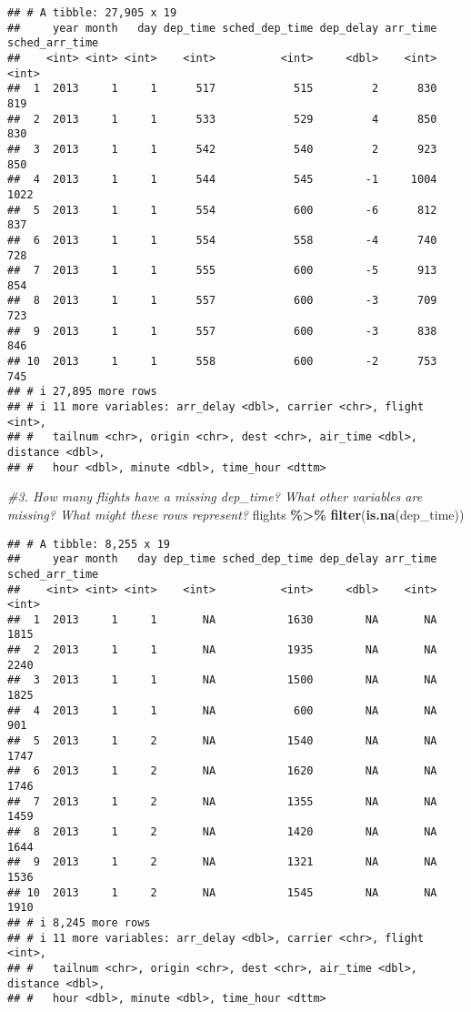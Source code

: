 \documentclass[
]{article}
\newenvironment{Shaded}{\begin{snugshade}}{\end{snugshade}}
\newcommand{\CommentTok}[1]{\textcolor[rgb]{0.56,0.35,0.01}{\textit{#1}}}
\newcommand{\FunctionTok}[1]{\textcolor[rgb]{0.13,0.29,0.53}{\textbf{#1}}}
\newcommand{\NormalTok}[1]{#1}
\newcommand{\SpecialCharTok}[1]{\textcolor[rgb]{0.81,0.36,0.00}{\textbf{#1}}}
\begin{document}
\begin{verbatim}
## # A tibble: 27,905 x 19
##     year month   day dep_time sched_dep_time dep_delay arr_time sched_arr_time
##    <int> <int> <int>    <int>          <int>     <dbl>    <int>          <int>
##  1  2013     1     1      517            515         2      830            819
##  2  2013     1     1      533            529         4      850            830
##  3  2013     1     1      542            540         2      923            850
##  4  2013     1     1      544            545        -1     1004           1022
##  5  2013     1     1      554            600        -6      812            837
##  6  2013     1     1      554            558        -4      740            728
##  7  2013     1     1      555            600        -5      913            854
##  8  2013     1     1      557            600        -3      709            723
##  9  2013     1     1      557            600        -3      838            846
## 10  2013     1     1      558            600        -2      753            745
## # i 27,895 more rows
## # i 11 more variables: arr_delay <dbl>, carrier <chr>, flight <int>,
## #   tailnum <chr>, origin <chr>, dest <chr>, air_time <dbl>, distance <dbl>,
## #   hour <dbl>, minute <dbl>, time_hour <dttm>
\end{verbatim}

\begin{Shaded}
\begin{Highlighting}[]
\CommentTok{\#3. How many flights have a missing dep\_time? What other variables are missing? What might these rows represent?}
\NormalTok{flights }\SpecialCharTok{\%\textgreater{}\%} \FunctionTok{filter}\NormalTok{(}\FunctionTok{is.na}\NormalTok{(dep\_time))}
\end{Highlighting}
\end{Shaded}

\begin{verbatim}
## # A tibble: 8,255 x 19
##     year month   day dep_time sched_dep_time dep_delay arr_time sched_arr_time
##    <int> <int> <int>    <int>          <int>     <dbl>    <int>          <int>
##  1  2013     1     1       NA           1630        NA       NA           1815
##  2  2013     1     1       NA           1935        NA       NA           2240
##  3  2013     1     1       NA           1500        NA       NA           1825
##  4  2013     1     1       NA            600        NA       NA            901
##  5  2013     1     2       NA           1540        NA       NA           1747
##  6  2013     1     2       NA           1620        NA       NA           1746
##  7  2013     1     2       NA           1355        NA       NA           1459
##  8  2013     1     2       NA           1420        NA       NA           1644
##  9  2013     1     2       NA           1321        NA       NA           1536
## 10  2013     1     2       NA           1545        NA       NA           1910
## # i 8,245 more rows
## # i 11 more variables: arr_delay <dbl>, carrier <chr>, flight <int>,
## #   tailnum <chr>, origin <chr>, dest <chr>, air_time <dbl>, distance <dbl>,
## #   hour <dbl>, minute <dbl>, time_hour <dttm>
\end{verbatim}
\end{document}
